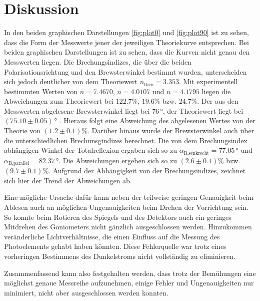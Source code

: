 \section{Diskussion}
\label{sec:Diskussion}

In den beiden graphischen Darstellungen \autoref{fig:plot0} und \autoref{fig:plot90} ist zu sehen, dass die Form der Messwerte jener der jeweiligen Theoriekurve entsprechen. Bei beiden graphischen Darstellungen ist zu sehen, dass die Kurven nicht genau den Messwerten liegen.
Die Brechungsindizes, die über die beiden Polarisationsrichtung und den Brewsterwinkel bestimmt wurden, unterscheiden sich jedoch deutlicher von dem Theoriewert $n_{\text{theo}}=3.353$. Mit
experimentell bestimmten Werten von $\bar{n}=7.4670$, $\bar{n}= 4.0107$ und $\bar{n}= 4.1795$ liegen die Abweichungen zum Theoriewert bei $122.7\%$,  $19.6\%$ bzw. $24.7\%$. 
Der aus den Messwerten abgelesene Brewsterwinkel liegt bei $76\, °$, der Theoriewert liegt bei $(75.10 \pm 0.05)\, °$ \cite{Brewsterwinkel}. Hieraus folgt eine Abweichung des abgelesenen Wertes von der Theorie von $(1.2 \pm 0.1)\%$.
Darüber hinaus wurde der Brewsterwinkel auch über die unterschiedlichen Brechunsgindizes berechnet. Die von dem Brechungsindex abhängigen Winkel der Totalreflexion ergaben sich so zu $\alpha_{\text{B,senkrecht}}=77.05\, °$ und $\alpha_{\text{B,parallel}}=82.37\, °$.
Die Abweichungen ergeben sich so zu $(2.6 \pm 0.1)\%$ bzw. $(9.7 \pm 0.1)\%$. Aufgrund der Abhängigkeit von der Brechungsindizes, zeichnet sich hier der Trend der Abweichungen ab.

Eine mögliche Ursache dafür kann neben der teilweise geringen
Genauigkeit beim Ablesen auch an möglichen Ungenauigkeiten beim Drehen der Vorrichtung sein. So konnte beim Rotieren des Spiegels und des Detektors auch ein geringes Mitdrehen des Goniometers nicht gänzlich ausgeschlossen werden.
Hinzukommen veränderliche Lichtverhältnisse, die einen Einfluss auf die Messung des Photoelements gehabt haben könnten. Diese Fehlerquelle war trotz eines vorheringen Bestimmens des Dunkelstroms nicht vollständig zu eliminieren.

Zusammenfassend kann also festgehalten werden, dass trotz der Bemühungen eine möglichst genaue Messreihe aufzunehmen, einige Fehler und Ungenauigkeiten nur minimiert, nicht aber ausgeschlossen werden konnten.